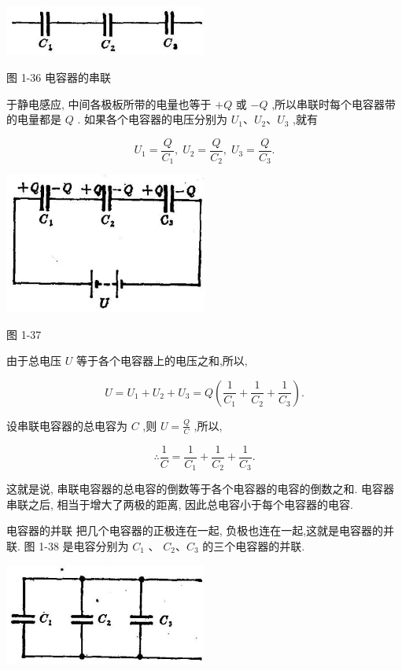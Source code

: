 \documentclass[10pt]{article}
\begin{document}
\begin{center}
\includegraphics[max width=0.5\textwidth]{images/01913056-1f15-74d8-9184-9aab52c9d66b_48_705439.jpg}
\end{center}

图 1-36 电容器的串联

于静电感应, 中间各极板所带的电量也等于 \(+ Q\) 或 \(- Q\) ,所以串联时每个电容器带的电量都是 \(Q\) . 如果各个电容器的电压分别为 \({U}_{1}\text{、}{U}_{2}\text{、}{U}_{3}\) ,就有

\[
{U}_{1} = \frac{Q}{{C}_{1}},\;{U}_{2} = \frac{Q}{{C}_{2}},\;{U}_{3} = \frac{Q}{{C}_{3}}.
\]

\begin{center}
\includegraphics[max width=0.5\textwidth]{images/01913056-1f15-74d8-9184-9aab52c9d66b_49_766231.jpg}
\end{center}

图 1-37

由于总电压 \(U\) 等于各个电容器上的电压之和,所以,

\[
U = {U}_{1} + {U}_{2} + {U}_{3} = Q\left( {\frac{1}{{C}_{1}} + \frac{1}{{C}_{2}} + \frac{1}{{C}_{3}}}\right) .
\]

设串联电容器的总电容为 \(C\) ,则 \(U = \frac{Q}{C}\) ,所以,

\[
\therefore \frac{1}{C} = \frac{1}{{C}_{1}} + \frac{1}{{C}_{2}} + \frac{1}{{C}_{3}}\text{.}
\]

这就是说, 串联电容器的总电容的倒数等于各个电容器的电容的倒数之和. 电容器串联之后, 相当于增大了两极的距离, 因此总电容小于每个电容器的电容.

电容器的并联 把几个电容器的正极连在一起, 负极也连在一起,这就是电容器的并联. 图 1-38 是电容分别为 \({C}_{1}\) 、 \({C}_{2}\text{、}{C}_{3}\) 的三个电容器的并联.

\begin{center}
\includegraphics[max width=0.5\textwidth]{images/01913056-1f15-74d8-9184-9aab52c9d66b_49_640946.jpg}
\end{center}
\end{document}
